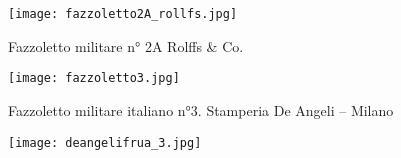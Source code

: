 \begin{figure}[h]
	\centering
		\texttt{[image: fazzoletto2A\_rollfs.jpg]}
	\caption{Fazzoletto militare n° 2A Rolffs \& Co.}
	\label{fig:fazzoletto2A_rollfs}
\end{figure}

\newpage

\begin{figure}[h]
	\centering
		\texttt{[image: fazzoletto3.jpg]}
	\caption{Fazzoletto militare italiano n°3. Stamperia De Angeli – Milano}
	\label{fig:fazzoletto3}
\end{figure}

\newpage

\begin{figure}[h]
	\centering
		\texttt{[image: deangelifrua\_3.jpg]}
	\caption{}
	\label{fig:deangelifrua_3}
\end{figure}

\newpage

